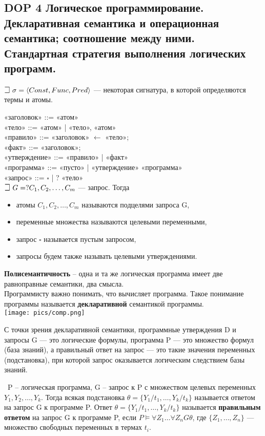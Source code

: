 \subsection{DOP 4 Логическое  программирование. Декларативная семантика и операционная семантика;  соотношение между ними.  Стандартная стратегия выполнения логических программ.}

$\mathLet ~ \sigma = \langle Const,Func,Pred\rangle$ — некоторая сигнатура, в которой определяются термы и атомы.

«заголовок» ::= «атом» \\
«тело» ::= «атом» | «тело», «атом» \\ 
«правило» ::= «заголовок» $\leftarrow$ «тело»; \\
«факт» ::= «заголовок»; \\ 
«утверждение» ::= «правило» | «факт» \\ 
«программа» ::= «пусто» | «утверждение» «программа» \\
«запрос» ::= $\square$ | ? «тело» \\

$\mathLet ~ G = ? C_{1},C_{2},\ldots,C_{m}$ — запрос. Тогда
\begin{itemize}
    \item атомы $C_{1},C_{2},\ldots,C_{m}$ называются подцелями запроса G,
    \item переменные множества называются целевыми переменными,
    \item запрос $\square$ называется пустым запросом,
    \item запросы будем также называть целевыми утверждениями.
\end{itemize}
 
\textbf{Полисемантичность} -- одна и та же логическая программа имеет две равноправные семантики, два смысла. \\
Программисту важно понимать, что вычисляет программа. Такое понимание программы называется \textbf{декларативной} семантикой программы. \\ 
\texttt{[image: pics/comp.png]}

С точки зрения декларативной семантики, программные утверждения D и запросы G — это логические формулы, программа P — это множество формул (база знаний), а правильный ответ на запрос — это такие значения переменных (подстановка), при которой запрос оказывается логическим следствием базы знаний.

\mathLet \ P -- логическая программа, G -- запрос к P с множеством целевых переменных $Y_{1},Y_{2},\ldots,Y_{k}$. Тогда всякая подстановка $\theta = \{Y_{1}/t_{1},\ldots,Y_{k}/t_{k}\}$ называется ответом на запрос G к программе P. Ответ $\theta = \{Y_{1}/t_{1},\ldots, Y_{k}/t_{k}\}$ называется \textbf{правильным ответом} на запрос G к программе P, если $P \models \forall Z_{1} \ldots \forall Z_{n}G\theta$, где $\{Z_{1},\ldots,Z_{n}\}$ --- множество свободных переменных в термах $t_i$.

